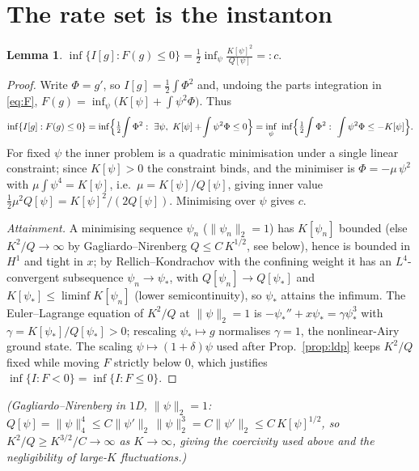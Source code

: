 \documentclass[11pt]{article}
\newtheorem{lemma}{Lemma}
\theoremstyle{remark}
\newcommand{\Kf}{K}
\newcommand{\Qf}{Q}
\begin{document}
\section{The rate set is the instanton}\label{sec:rate}

\begin{lemma}\label{lem:rate}
$\displaystyle \inf\{I[g]:F(g)\le0\}=\tfrac12\inf_{\psi}\frac{\Kf[\psi]^2}{\Qf[\psi]}=:c.$
\end{lemma}

\begin{proof}
Write $\Phi=g'$, so $I[g]=\tfrac12\int\Phi^2$ and, undoing the parts integration in
\eqref{eq:F}, $F(g)=\inf_\psi\bigl(\Kf[\psi]+\int\psi^2\Phi\bigr)$. Thus
\[
  \inf\{I[g]:F(g)\le0\}
  =\inf\Bigl\{\tfrac12\!\int\Phi^2:\ \exists\psi,\ \Kf[\psi]+\!\int\psi^2\Phi\le0\Bigr\}
  =\inf_\psi\ \inf\Bigl\{\tfrac12\!\int\Phi^2:\ \int\psi^2\Phi\le-\Kf[\psi]\Bigr\}.
\]
For fixed $\psi$ the inner problem is a quadratic minimisation under a single linear
constraint; since $\Kf[\psi]>0$ the constraint binds, and the minimiser is
$\Phi=-\mu\,\psi^2$ with $\mu\int\psi^4=\Kf[\psi]$, i.e.\ $\mu=\Kf[\psi]/\Qf[\psi]$,
giving inner value $\tfrac12\mu^2\Qf[\psi]=\Kf[\psi]^2/(2\Qf[\psi])$. Minimising over
$\psi$ gives $c$.

\emph{Attainment.} A minimising sequence $\psi_n$ ($\|\psi_n\|_2=1$) has $\Kf[\psi_n]$
bounded (else $\Kf^2/\Qf\to\infty$ by Gagliardo--Nirenberg
$\Qf\le C\,\Kf^{1/2}$, see below), hence is bounded in $H^1$ and tight in $x$; by
Rellich--Kondrachov with the confining weight it has an $L^4$-convergent subsequence
$\psi_n\to\psi_*$, with $\Qf[\psi_n]\to\Qf[\psi_*]$ and $\Kf[\psi_*]\le\liminf\Kf[\psi_n]$
(lower semicontinuity), so $\psi_*$ attains the infimum. The Euler--Lagrange equation of
$\Kf^2/\Qf$ at $\|\psi\|_2=1$ is $-\psi_*''+x\psi_*=\gamma\psi_*^3$ with
$\gamma=\Kf[\psi_*]/\Qf[\psi_*]>0$; rescaling $\psi_*\mapsto g$ normalises $\gamma=1$,
the nonlinear-Airy ground state. The scaling $\psi\mapsto(1+\delta)\psi$ used after
Prop.~\ref{prop:ldp} keeps $\Kf^2/\Qf$ fixed while moving $F$ strictly below $0$, which
justifies $\inf\{I:F<0\}=\inf\{I:F\le0\}$.
\end{proof}

\noindent\emph{(Gagliardo--Nirenberg in $1$D, $\|\psi\|_2=1$:
$\Qf[\psi]=\|\psi\|_4^4\le C\|\psi'\|_2\,\|\psi\|_2^3=C\|\psi'\|_2\le C\,\Kf[\psi]^{1/2}$,
so $\Kf^2/\Qf\ge \Kf^{3/2}/C\to\infty$ as $\Kf\to\infty$, giving the coercivity used
above and the negligibility of large-$\Kf$ fluctuations.)}
\end{document}
